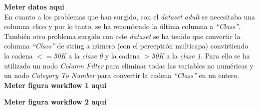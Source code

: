 \documentclass[10pt,a4paper]{article}
\begin{document}
{\Huge \textbf{Meter datos aqui}}\\

En cuanto a los problemas que han surgido, con el \emph{dataset} \emph{adult} se necesitaba una columna \emph{class} y por lo tanto, se ha renombrado la última columna a \emph{``Class''}. También otro problema surgido con este \emph{dataset} se ha tenido que convertir la columna \emph{``Class''} de string a número (con el perceptrón multicapa) convirtiendo la cadena \emph{$<=$50K} a la \emph{clase 0} y la cadena \emph{$>$50K} a la \emph{clase 1}. Para ello se ha utilizado un nodo \emph{Column Filter} para eliminar todas las variables no numéricas y un nodo \emph{Category To Number} para convertir la cadena \emph{``Class''} en un entero.\\


{\Huge \textbf{Meter figura workflow 1 aqui}}

{\Huge \textbf{Meter figura workflow 2 aqui}}
\end{document}

